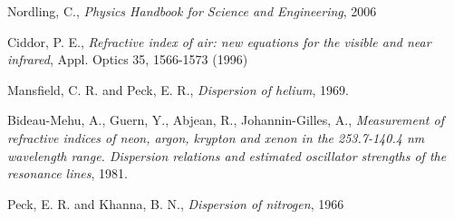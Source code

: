 
\begin{thebibliography}{}

 Nordling, C., \textit{Physics Handbook for Science and Engineering}, 2006

 Ciddor, P. E., \textit{Refractive index of air: new equations for the visible and near infrared}, Appl. Optics 35, 1566-1573 (1996)

 Mansfield, C. R. and Peck, E. R., \textit{Dispersion of helium}, 1969.

 Bideau-Mehu, A., Guern, Y., Abjean, R., Johannin-Gilles, A., \textit{Measurement of refractive indices of neon, argon, krypton and xenon in the 253.7-140.4 nm wavelength range. Dispersion relations and estimated oscillator strengths of the resonance lines}, 1981.

 Peck, E. R. and Khanna, B. N., \textit{Dispersion of nitrogen}, 1966


\end{thebibliography}
